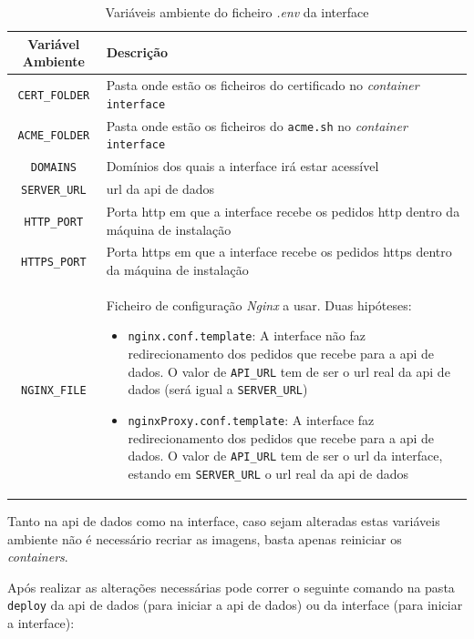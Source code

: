 \begin{table}[H]
\fontsize{10}{12}\selectfont
\begin{tabularx}{\textwidth}{|c|X|}
    \hline
    Variável Ambiente & Descrição \\ \hline
    \texttt{CERT\_FOLDER} & Pasta onde estão os ficheiros do certificado no \textit{container} \texttt{interface} \\ \hline
    \texttt{ACME\_FOLDER} & Pasta onde estão os ficheiros do \texttt{acme.sh} no \textit{container} \texttt{interface} \\ \hline
    \texttt{DOMAINS} & Domínios dos quais a interface irá estar acessível \\ \hline
    \texttt{SERVER\_URL} & \acrshort{url} da \acrshort{api} de dados \\ \hline
    \texttt{HTTP\_PORT} & Porta \acrshort{http} em que a interface recebe os pedidos \acrshort{http} dentro da máquina de instalação \\ \hline
    \texttt{HTTPS\_PORT} & Porta \acrshort{https} em que a interface recebe os pedidos \acrshort{https} dentro da máquina de instalação \\ \hline
    \texttt{NGINX\_FILE} & Ficheiro de configuração \textit{Nginx} a usar. Duas hipóteses:
    \begin{itemize}
        \item \texttt{nginx.conf.template}: A interface não faz redirecionamento dos pedidos que recebe para a \acrshort{api} de dados. O valor de \texttt{API\_URL} tem de ser o \acrshort{url} real da \acrshort{api} de dados (será igual a \texttt{SERVER\_URL})
        \item \texttt{nginxProxy.conf.template}: A interface faz redirecionamento dos pedidos que recebe para a \acrshort{api} de dados. O valor de \texttt{API\_URL} tem de ser o \acrshort{url} da interface, estando em \texttt{SERVER\_URL} o \acrshort{url} real da \acrshort{api} de dados
    \end{itemize}
    \\ \hline
\end{tabularx}
\caption{Variáveis ambiente do ficheiro \textit{.env} da interface}
\end{table}

Tanto na \acrshort{api} de dados como na interface, caso sejam alteradas estas variáveis ambiente não é necessário recriar as imagens, basta apenas reiniciar os \textit{containers}.

Após realizar as alterações necessárias pode correr o seguinte comando na pasta \texttt{deploy} da \acrshort{api} de dados (para iniciar a \acrshort{api} de dados) ou da interface (para iniciar a interface):

